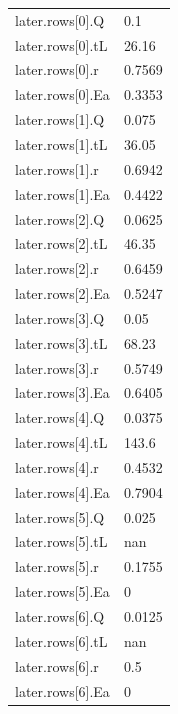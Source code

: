 {\begin{longtable}{p{}p{}}
{}later.rows[0].Q & 0.1\\
{}later.rows[0].tL & 26.16\\
{}later.rows[0].r & 0.7569\\
{}later.rows[0].Ea & 0.3353\\
{}later.rows[1].Q & 0.075\\
{}later.rows[1].tL & 36.05\\
{}later.rows[1].r & 0.6942\\
{}later.rows[1].Ea & 0.4422\\
{}later.rows[2].Q & 0.0625\\
{}later.rows[2].tL & 46.35\\
{}later.rows[2].r & 0.6459\\
{}later.rows[2].Ea & 0.5247\\
{}later.rows[3].Q & 0.05\\
{}later.rows[3].tL & 68.23\\
{}later.rows[3].r & 0.5749\\
{}later.rows[3].Ea & 0.6405\\
{}later.rows[4].Q & 0.0375\\
{}later.rows[4].tL & 143.6\\
{}later.rows[4].r & 0.4532\\
{}later.rows[4].Ea & 0.7904\\
{}later.rows[5].Q & 0.025\\
{}later.rows[5].tL & nan\\
{}later.rows[5].r & 0.1755\\
{}later.rows[5].Ea & 0\\
{}later.rows[6].Q & 0.0125\\
{}later.rows[6].tL & nan\\
{}later.rows[6].r & 0.5\\
{}later.rows[6].Ea & 0\\
\bottomrule\end{longtable}}

